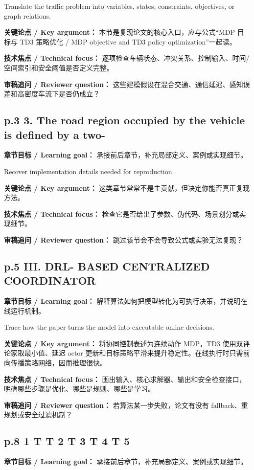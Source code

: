 \documentclass[UTF8,a4paper,11pt,fontset=fandol]{ctexart}
\begin{document}
Translate the traffic problem into variables, states, constraints, objectives, or graph relations.

\textbf{关键论点 / Key argument：} 本节是复现论文的核心入口，应与公式“MDP 目标与 TD3 策略优化 / MDP objective and TD3 policy optimization”一起读。

\textbf{技术焦点 / Technical focus：} 逐项检查车辆状态、冲突关系、控制输入、时间/空间索引和安全阈值是否定义完整。

\textbf{审稿追问 / Reviewer question：} 这些建模假设在混合交通、通信延迟、感知误差和高密度车流下是否仍成立？

\subsection*{p.3 3. The road region occupied by the vehicle is deﬁned by a two-}
\textbf{章节目标 / Learning goal：} 承接前后章节，补充局部定义、案例或实现细节。

Recover implementation details needed for reproduction.

\textbf{关键论点 / Key argument：} 这类章节常常不是主贡献，但决定你能否真正复现方法。

\textbf{技术焦点 / Technical focus：} 检查它是否给出了参数、伪代码、场景划分或实现细节。

\textbf{审稿追问 / Reviewer question：} 跳过该节会不会导致公式或实验无法复现？

\subsection*{p.5 III. DRL- BASED CENTRALIZED COORDINATOR}
\textbf{章节目标 / Learning goal：} 解释算法如何把模型转化为可执行决策，并说明在线运行机制。

Trace how the paper turns the model into executable online decisions.

\textbf{关键论点 / Key argument：} 将协同控制表述为连续动作 MDP，TD3 使用双评论家取最小值、延迟 actor 更新和目标策略平滑来提升稳定性。在线执行时只需前向传播策略网络，因而推理很快。

\textbf{技术焦点 / Technical focus：} 画出输入、核心求解器、输出和安全检查接口，明确哪些步骤是优化、哪些是规则、哪些是学习。

\textbf{审稿追问 / Reviewer question：} 若算法某一步失败，论文有没有 fallback、重规划或安全过滤机制？

\subsection*{p.8 1 T T 2 T 3 T 4 T 5}
\textbf{章节目标 / Learning goal：} 承接前后章节，补充局部定义、案例或实现细节。
\end{document}
